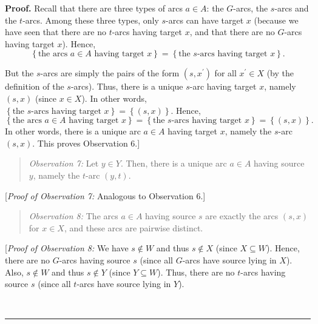 \documentclass[numbers=enddot,12pt,final,onecolumn,notitlepage]{scrartcl}%
\theoremstyle{definition}
\newenvironment{statement}{\begin{quote}}{\end{quote}}
\newenvironment{proof}[1][Proof]{\noindent\textbf{#1.} }{\ \rule{0.5em}{0.5em}}
\begin{document}
\begin{proof}
Recall that there are three types of arcs $a\in A$: the $G$-arcs, the $s$-arcs
and the $t$-arcs. Among these three types, only $s$-arcs can have target $x$
(because we have seen that there are no $t$-arcs having target $x$, and that
there are no $G$-arcs having target $x$). Hence,%
\[
\left\{  \text{the arcs }a\in A\text{ having target }x\right\}  =\left\{
\text{the }s\text{-arcs having target }x\right\}  .
\]


But the $s$-arcs are simply the pairs of the form $\left(  s,x^{\prime
}\right)  $ for all $x^{\prime}\in X$ (by the definition of the $s$-arcs).
Thus, there is a unique $s$-arc having target $x$, namely $\left(  s,x\right)
$ (since $x\in X$). In other words, $\left\{  \text{the }s\text{-arcs having
target }x\right\}  =\left\{  \left(  s,x\right)  \right\}  $. Hence,%
\[
\left\{  \text{the arcs }a\in A\text{ having target }x\right\}  =\left\{
\text{the }s\text{-arcs having target }x\right\}  =\left\{  \left(
s,x\right)  \right\}  .
\]
In other words, there is a unique arc $a\in A$ having target $x$, namely the
$s$-arc $\left(  s,x\right)  $. This proves Observation 6.]

\begin{statement}
\textit{Observation 7:} Let $y\in Y$. Then, there is a unique arc $a\in A$
having source $y$, namely the $t$-arc $\left(  y,t\right)  $.
\end{statement}

[\textit{Proof of Observation 7:} Analogous to Observation 6.]

\begin{statement}
\textit{Observation 8:} The arcs $a\in A$ having source $s$ are exactly the
arcs $\left(  s,x\right)  $ for $x\in X$, and these arcs are pairwise distinct.
\end{statement}

[\textit{Proof of Observation 8:} We have $s\notin W$ and thus $s\notin X$
(since $X\subseteq W$). Hence, there are no $G$-arcs having source $s$ (since
all $G$-arcs have source lying in $X$). Also, $s\notin W$ and thus $s\notin Y$
(since $Y\subseteq W$). Thus, there are no $t$-arcs having source $s$ (since
all $t$-arcs have source lying in $Y$).


\end{proof}
\end{document}

